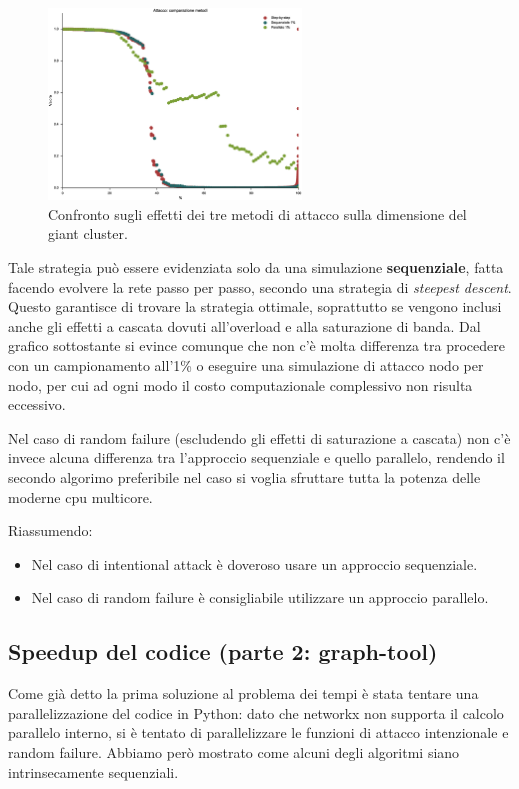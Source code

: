 \begin{figure}[t!]
	\centering
	\includegraphics[width=0.6\textwidth]{./Immagini/Attack/AttackGC_Compare}
	\caption[Confronto metodi.]{Confronto sugli effetti dei tre metodi di attacco sulla dimensione del giant cluster.}
	\label{fig:compattack}
\end{figure}

Tale strategia può essere evidenziata solo da una simulazione \textbf{sequenziale}, fatta facendo evolvere la rete passo per passo, secondo una strategia di \emph{steepest descent}. Questo garantisce di trovare la strategia ottimale, soprattutto se vengono inclusi anche gli effetti a cascata dovuti all'overload e alla saturazione di banda. Dal grafico sottostante si evince comunque che non c'è molta differenza tra procedere con un campionamento all'1\% o eseguire una simulazione di attacco nodo per nodo, per cui ad ogni modo il costo computazionale complessivo non risulta eccessivo.

Nel caso di random failure (escludendo gli effetti di saturazione a cascata) non c'è invece alcuna differenza tra l'approccio sequenziale e quello parallelo, rendendo il secondo algorimo preferibile nel caso si voglia sfruttare tutta la potenza delle moderne cpu multicore.

Riassumendo:
\begin{itemize}
 \item Nel caso di intentional attack è doveroso usare un approccio sequenziale. 
 \item Nel caso di random failure è consigliabile utilizzare un approccio parallelo.
\end{itemize}

\subsection{Speedup del codice (parte 2: graph-tool)}
Come già detto la prima soluzione al problema dei tempi è stata tentare una parallelizzazione del codice in Python: dato che networkx non supporta il calcolo parallelo interno, si è tentato di parallelizzare le funzioni di attacco intenzionale e random failure. Abbiamo però mostrato come alcuni degli algoritmi siano intrinsecamente sequenziali.


